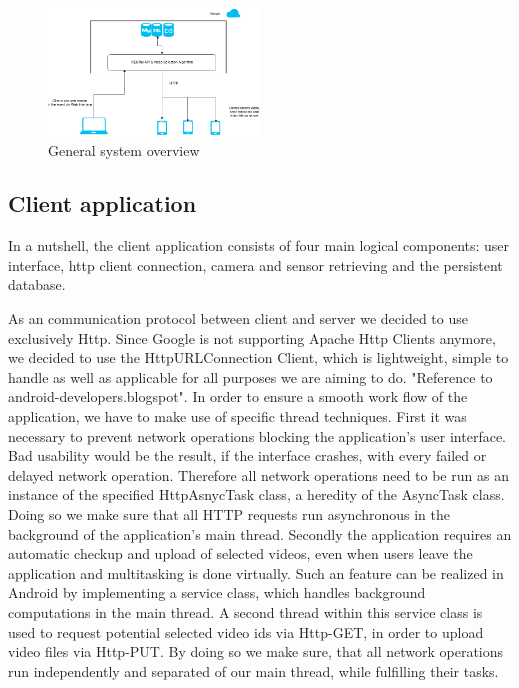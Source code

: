 \documentclass[conference]{IEEEtran}
\begin{document}
\begin{figure}[!t]
	\centering
	\includegraphics[width=0.5\textwidth]{scetch-overview.png}
	\caption{General system overview}
	\label{fig:gen_arch}
\end{figure}


\subsection{Client application}

In a nutshell, the client application consists of four main logical components: user interface, http client connection, camera and sensor retrieving and the persistent database.

As an communication protocol between client and server we decided to use exclusively Http. Since Google is not supporting Apache Http Clients anymore, we decided to use the HttpURLConnection Client, which is lightweight, simple to handle as well as applicable for all purposes we are aiming to do. "Reference to android-developers.blogspot".
In order to ensure a smooth work flow of the application, we have to make use of specific thread techniques.
First it was necessary to prevent network operations blocking the application's user interface. Bad usability would be the result, if the interface crashes, with every failed or delayed network operation. Therefore all network operations need to be run as an instance of the specified HttpAsnycTask class, a heredity of the AsyncTask class. Doing so we make sure that all HTTP requests run asynchronous in the background of the application's main thread.
Secondly the application requires an automatic checkup and upload of selected videos, even when users leave the application and multitasking is done virtually. Such an feature can be realized in Android by implementing a service class, which handles background computations in the main thread. A second thread within this service class is used to request potential selected video ids via Http-GET, in order to upload video files via Http-PUT.
By doing so we make sure, that all network operations run independently and separated of our main thread, while fulfilling their tasks.
\end{document}
